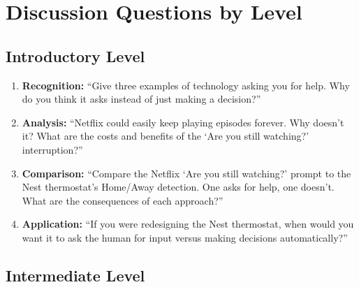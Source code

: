 \section{Discussion Questions by Level}

\subsection{Introductory Level}

\begin{enumerate}
    \item \textbf{Recognition:} ``Give three examples of technology asking you for help. Why do you think it asks instead of just making a decision?''

    \item \textbf{Analysis:} ``Netflix could easily keep playing episodes forever. Why doesn't it? What are the costs and benefits of the `Are you still watching?' interruption?''

    \item \textbf{Comparison:} ``Compare the Netflix `Are you still watching?' prompt to the Nest thermostat's Home/Away detection. One asks for help, one doesn't. What are the consequences of each approach?''

    \item \textbf{Application:} ``If you were redesigning the Nest thermostat, when would you want it to ask the human for input versus making decisions automatically?''
\end{enumerate}

\subsection{Intermediate Level}

